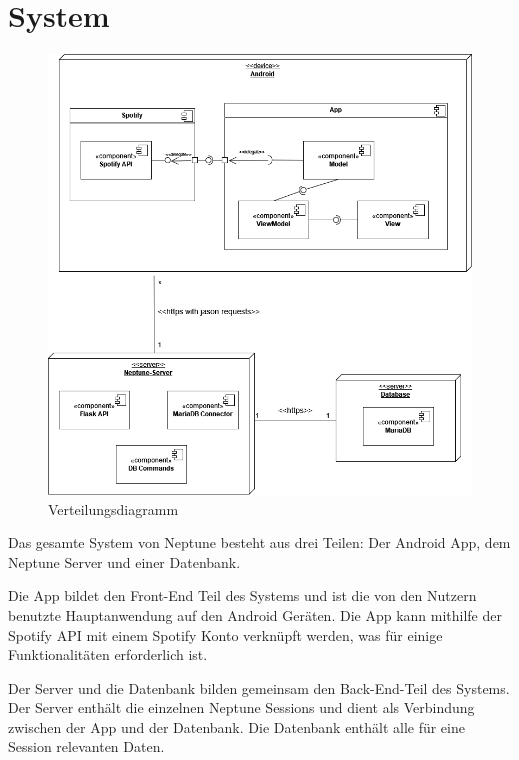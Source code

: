 \documentclass[oneside, ngerman]{sdqtechreport}
\begin{document}
\chapter{System}
\label{chap:System}

\begin{figure}[h]
    \includegraphics[width = 16cm]{LATEX/Entwurf/Graphics/Component-Diagram.png}
    \caption{Verteilungsdiagramm}
    \label{fig:Verteilungsdiagramm}
\end{figure}

\vspace{2cm}

Das gesamte System von Neptune besteht aus drei Teilen: Der Android App, dem Neptune Server und einer Datenbank.

Die App bildet den Front-End Teil des Systems und ist die von den Nutzern benutzte Hauptanwendung auf den Android Geräten. Die App kann mithilfe der Spotify API mit einem Spotify Konto verknüpft werden, was für einige Funktionalitäten erforderlich ist.

Der Server und die Datenbank bilden gemeinsam den Back-End-Teil des Systems. Der Server enthält die einzelnen Neptune Sessions und dient als Verbindung zwischen der App und der Datenbank. Die Datenbank enthält alle für eine Session relevanten Daten.
\end{document}
